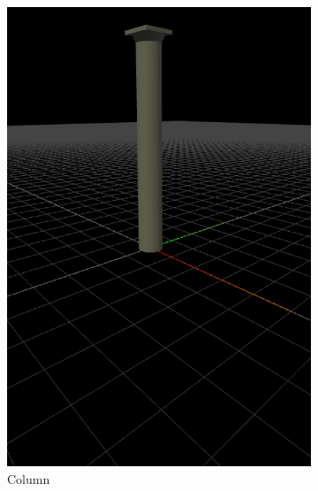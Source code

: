 \begin{figure}
\begin{subfigure}[b]{0.3\linewidth}
    \includegraphics[width=1.0\linewidth]{./images/all_examples/column_crop}
    \caption{Column}
    \label{fig:ex:column}
  \end{subfigure}
  \begin{subfigure}[b]{0.3\linewidth}

\end{subfigure}
\end{figure}
